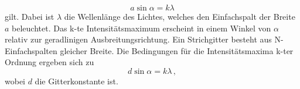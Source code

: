 \begin{equation}
    a \sin \alpha = k \lambda
    \label{eqn:einf}
\end{equation}
gilt. Dabei ist $\lambda$ die Wellenlänge des Lichtes, welches den Einfachspalt der Breite $a$ beleuchtet. Das k-te Intensitätsmaximum erscheint in einem Winkel von $\alpha$ relativ zur geradlinigen Ausbreitungsrichtung.
Ein Strichgitter besteht aus N-Einfachspalten gleicher Breite. Die Bedingungen für die Intensitätsmaxima k-ter Ordnung ergeben sich zu
\begin{equation}
    d \sin \alpha = k \lambda \, ,
    \label{eqn:gitter}
\end{equation}
wobei $d$ die Gitterkonstante ist.



